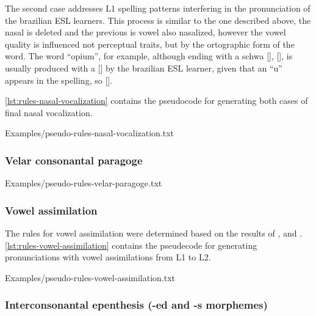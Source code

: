 The second case addresses L1 spelling patterns interfering in the pronunciation of the brazilian \ac{ESL} learners. This process
is similar to the one described above, the nasal is deleted and the previous is vowel also nasalized, however the vowel quality is 
influenced not perceptual traits, but by the ortographic form of the word. The word ``opium'', for example, although ending
with a schwa [], [], is usually produced with a [] by the brazilian \ac{ESL} learner, given that an ``u''
appears in the spelling, so [].

\autoref{lst:rules-nasal-vocalization} contains the pseudocode for generating both cases of final nasal vocalization.

%
    {Examples/pseudo-rules-nasal-vocalization.txt}

\clearpage
\subsubsection{Velar consonantal paragoge}

%
    {Examples/pseudo-rules-velar-paragoge.txt}

\clearpage
\subsubsection{Vowel assimilation}

The rules for vowel assimilation were determined based on the results of
\citeauthor{Battistela2010} \citep{Battistela2010}, \citeauthor{Rauber2005} \citep{Rauber2005} and \citeauthor{Rauber2006} \citep{Rauber2006}.
\autoref{lst:rules-vowel-assimilation} contains the pseudecode for generating pronunciations with vowel assimilations from L1 to L2.

%
    {Examples/pseudo-rules-vowel-assimilation.txt}

\clearpage
\subsubsection{Interconsonantal epenthesis (-ed and -s morphemes)}






